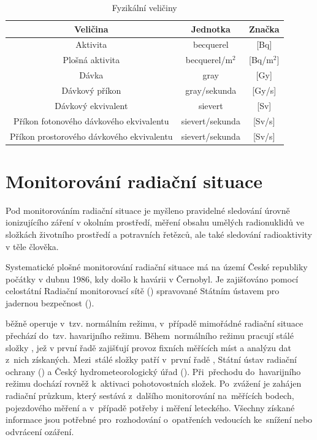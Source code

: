 \begin{itemize}
		\begin{table}[h!]
			\centering
			\caption{Fyzikální veličiny}
			\label{tab:tab_veliciny}
			\begin{tabular}{|c|c|c|}
				\hline
				\textbf{Veličina}           			& \textbf{Jednotka}  & \textbf{Značka}  \\ \hline
				Aktivita								& becquerel			 & {[}Bq{]}			\\ \hline
				Plošná aktivita							& becquerel/m$^2$	 & {[}Bq/m$^2${]}	\\ \hline
				Dávka                      	 			& gray               & {[}Gy{]}         \\ \hline
				Dávkový příkon              			& gray/sekunda		 & {[}Gy/s{]}       \\ \hline
				Dávkový ekvivalent          			& sievert            & {[}Sv{]}         \\ \hline
				Příkon fotonového dávkového ekvivalentu & sievert/sekunda	 & {[}Sv/s{]}       \\ \hline
				Příkon prostorového dávkového ekvivalentu & sievert/sekunda	 & {[}Sv/s{]}       \\ \hline
			\end{tabular}
		\end{table}
\end{itemize}

\section{Monitorování radiační situace}

Pod monitorováním radiační situace je myšleno pravidelné sledování
úrovně ionizujícího záření v okolním prostředí, měření obsahu umělých
radionuklidů ve složkách životního prostředí a potravních řetězců, ale
také sledování radioaktivity v těle člověka. \cite{monras}

Systematické plošné monitorování radiační situace má na území České
republiky počátky v dubnu 1986, kdy došlo k havárii v 
Černobyl. Je zajišťováno pomocí celostátní Radiační monitorovací sítě
() spravované Státním ústavem pro jadernou bezpečnost
().

 běžně operuje v~tzv. normálním režimu, v~případě mimořádné
radiační situace přechází do~tzv. havarijního režimu. Během~normálního
režimu pracují stálé složky , jež v první řadě zajišťují
provoz fixních měřících míst a analýzu dat z~nich získaných. 
Mezi~stálé složky  patří v~první řadě , Státní ústav
radiační ochrany () a Český hydrometeorologický úřad
(). Při~přechodu do~havarijního režimu dochází rovněž 
k~aktivaci pohotovostních složek. Po~zvážení je zahájen radiační
průzkum, který sestává z~dalšího monitorování na~měřících bodech,
pojezdového měření a v~případě potřeby i měření leteckého. \cite{suro}
Všechny získané informace jsou potřebné pro~rozhodování o~opatřeních
vedoucích ke~snížení nebo odvrácení ozáření.

